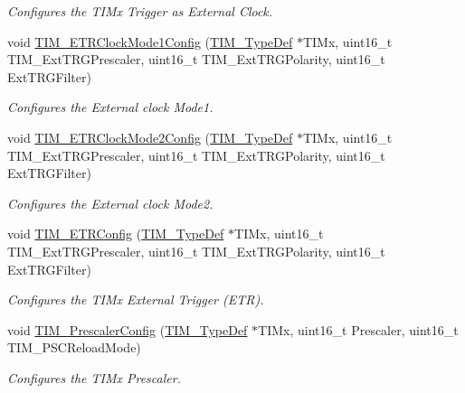 \begin{DoxyCompactItemize}
\begin{DoxyCompactList}\small\item\em Configures the T\+I\+Mx Trigger as External Clock. \end{DoxyCompactList}\item 
void \mbox{\hyperlink{group___t_i_m___private___functions_ga47c05638b93aabcd641dbc8859e1b2df}{T\+I\+M\+\_\+\+E\+T\+R\+Clock\+Mode1\+Config}} (\mbox{\hyperlink{struct_t_i_m___type_def}{T\+I\+M\+\_\+\+Type\+Def}} $\ast$T\+I\+Mx, uint16\+\_\+t T\+I\+M\+\_\+\+Ext\+T\+R\+G\+Prescaler, uint16\+\_\+t T\+I\+M\+\_\+\+Ext\+T\+R\+G\+Polarity, uint16\+\_\+t Ext\+T\+R\+G\+Filter)
\begin{DoxyCompactList}\small\item\em Configures the External clock Mode1. \end{DoxyCompactList}\item 
void \mbox{\hyperlink{group___t_i_m___private___functions_ga0a9cbcbab32326cbbdaf4c111f59ec20}{T\+I\+M\+\_\+\+E\+T\+R\+Clock\+Mode2\+Config}} (\mbox{\hyperlink{struct_t_i_m___type_def}{T\+I\+M\+\_\+\+Type\+Def}} $\ast$T\+I\+Mx, uint16\+\_\+t T\+I\+M\+\_\+\+Ext\+T\+R\+G\+Prescaler, uint16\+\_\+t T\+I\+M\+\_\+\+Ext\+T\+R\+G\+Polarity, uint16\+\_\+t Ext\+T\+R\+G\+Filter)
\begin{DoxyCompactList}\small\item\em Configures the External clock Mode2. \end{DoxyCompactList}\item 
void \mbox{\hyperlink{group___t_i_m___private___functions_ga8bdde400b7a30f3e747fe8e4962c0abe}{T\+I\+M\+\_\+\+E\+T\+R\+Config}} (\mbox{\hyperlink{struct_t_i_m___type_def}{T\+I\+M\+\_\+\+Type\+Def}} $\ast$T\+I\+Mx, uint16\+\_\+t T\+I\+M\+\_\+\+Ext\+T\+R\+G\+Prescaler, uint16\+\_\+t T\+I\+M\+\_\+\+Ext\+T\+R\+G\+Polarity, uint16\+\_\+t Ext\+T\+R\+G\+Filter)
\begin{DoxyCompactList}\small\item\em Configures the T\+I\+Mx External Trigger (E\+TR). \end{DoxyCompactList}\item 
void \mbox{\hyperlink{group___t_i_m___private___functions_ga45c6fd9041baf7f64c121e0172f305c7}{T\+I\+M\+\_\+\+Prescaler\+Config}} (\mbox{\hyperlink{struct_t_i_m___type_def}{T\+I\+M\+\_\+\+Type\+Def}} $\ast$T\+I\+Mx, uint16\+\_\+t Prescaler, uint16\+\_\+t T\+I\+M\+\_\+\+P\+S\+C\+Reload\+Mode)
\begin{DoxyCompactList}\small\item\em Configures the T\+I\+Mx Prescaler. \end{DoxyCompactList}\item 

\end{DoxyCompactItemize}
